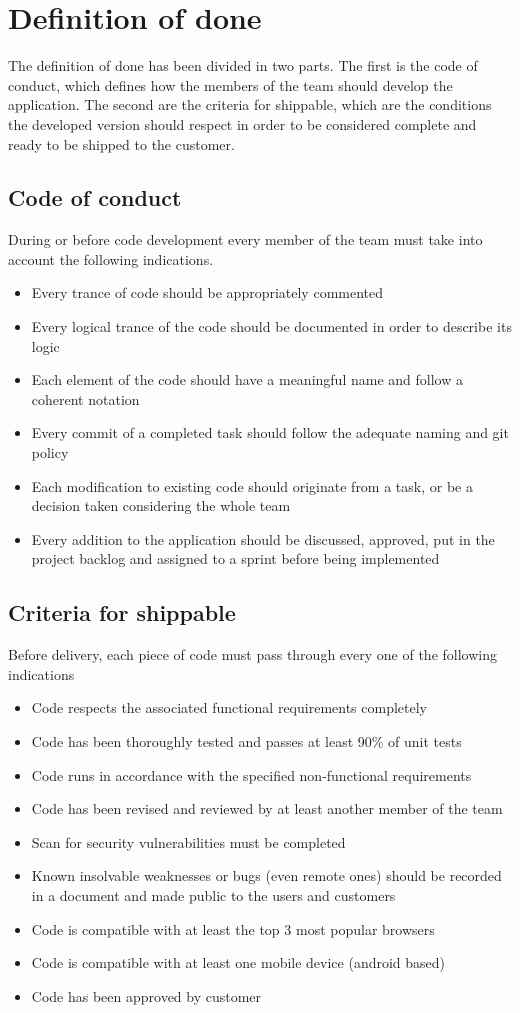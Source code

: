 \section{Definition of done} \label{definition_of_done}
The definition of done has been divided in two parts. The first is the code of conduct, which defines how the members of the team should develop the application. The second are the criteria for shippable, which are the conditions the developed version should respect in order to be considered complete and ready to be shipped to the customer.

\subsection{Code of conduct}
During or before code development every member of the team must take into account the following indications.
\begin{itemize}
	\item Every trance of code should be appropriately commented
	\item Every logical trance of the code should be documented in order to describe its logic
	\item Each element of the code should have a meaningful name and follow a coherent notation
	\item Every commit of a completed task should follow the adequate naming and git policy
	\item Each modification to existing code should originate from a task, or be a decision taken considering the whole team
	\item Every addition to the application should be discussed, approved, put in the project backlog and assigned to a sprint before being implemented
\end{itemize}

\subsection{Criteria for shippable}
Before delivery, each piece of code must pass through every one of the following indications
\begin{itemize}
	\item Code respects the associated functional requirements completely
	\item Code has been thoroughly tested and passes at least 90\% of unit tests
	\item Code runs in accordance with the specified non-functional requirements
	\item Code has been revised and reviewed by at least another member of the team
	\item Scan for security vulnerabilities must be completed
	\item Known insolvable weaknesses or bugs (even remote ones) should be recorded in a document and made public to the users and customers
	\item Code is compatible with at least the top 3 most popular browsers
	\item Code is compatible with at least one mobile device (android based)
	\item Code has been approved by customer
\end{itemize}